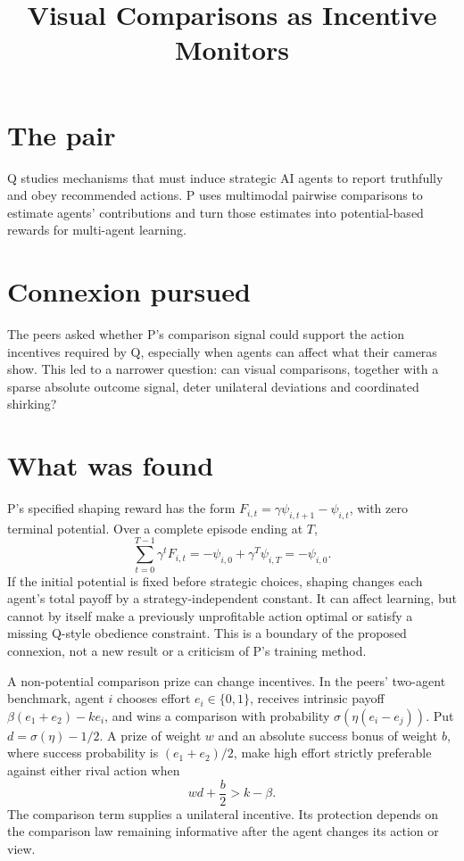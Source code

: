 \documentclass{article}
\title{Visual Comparisons as Incentive Monitors}
\begin{document}
\maketitle

\section*{The pair}

Q studies mechanisms that must induce strategic AI agents to report truthfully and obey recommended actions. P uses multimodal pairwise comparisons to estimate agents' contributions and turn those estimates into potential-based rewards for multi-agent learning.

\section*{Connexion pursued}

The peers asked whether P's comparison signal could support the action incentives required by Q, especially when agents can affect what their cameras show. This led to a narrower question: can visual comparisons, together with a sparse absolute outcome signal, deter unilateral deviations and coordinated shirking? 

\section*{What was found}

P's specified shaping reward has the form \(F_{i,t}=\gamma\psi_{i,t+1}-\psi_{i,t}\), with zero terminal potential. Over a complete episode ending at \(T\),
\[
\sum_{t=0}^{T-1}\gamma^tF_{i,t}
=-\psi_{i,0}+\gamma^T\psi_{i,T}
=-\psi_{i,0}.
\]
If the initial potential is fixed before strategic choices, shaping changes each agent's total payoff by a strategy-independent constant. It can affect learning, but cannot by itself make a previously unprofitable action optimal or satisfy a missing Q-style obedience constraint. This is a boundary of the proposed connexion, not a new result or a criticism of P's training method. 

A non-potential comparison prize can change incentives. In the peers' two-agent benchmark, agent \(i\) chooses effort \(e_i\in\{0,1\}\), receives intrinsic payoff \(\beta(e_1+e_2)-ke_i\), and wins a comparison with probability \(\sigma(\eta(e_i-e_j))\). Put \(d=\sigma(\eta)-1/2\). A prize of weight \(w\) and an absolute success bonus of weight \(b\), where success probability is \((e_1+e_2)/2\), make high effort strictly preferable against either rival action when
\[
wd+\frac b2>k-\beta.
\]
The comparison term supplies a unilateral incentive. Its protection depends on the comparison law remaining informative after the agent changes its action or view. 
\end{document}

